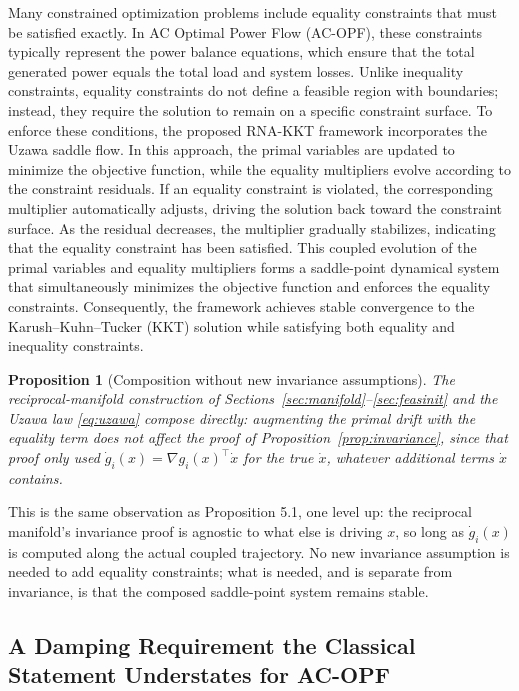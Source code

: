 \documentclass[11pt,onecolumn]{article}
\newtheorem{proposition}[theorem]{Proposition}
\theoremstyle{definition}
\theoremstyle{remark}
\begin{document}
Many constrained optimization problems include equality constraints that must be satisfied exactly. In AC Optimal Power Flow (AC-OPF), these constraints typically represent the power balance equations, which ensure that the total generated power equals the total load and system losses. Unlike inequality constraints, equality constraints do not define a feasible region with boundaries; instead, they require the solution to remain on a specific constraint surface. To enforce these conditions, the proposed RNA-KKT framework incorporates the Uzawa saddle flow. In this approach, the primal variables are updated to minimize the objective function, while the equality multipliers evolve according to the constraint residuals. If an equality constraint is violated, the corresponding multiplier automatically adjusts, driving the solution back toward the constraint surface. As the residual decreases, the multiplier gradually stabilizes, indicating that the equality constraint has been satisfied. This coupled evolution of the primal variables and equality multipliers forms a saddle-point dynamical system that simultaneously minimizes the objective function and enforces the equality constraints. Consequently, the framework achieves stable convergence to the Karush--Kuhn--Tucker (KKT) solution while satisfying both equality and inequality constraints.






\begin{proposition}[Composition without new invariance assumptions]
The reciprocal-manifold construction of Sections~\ref{sec:manifold}--\ref{sec:feasinit} and the
Uzawa law \eqref{eq:uzawa} compose directly: augmenting the primal drift with the equality term
does not affect the proof of Proposition~\ref{prop:invariance}, since that proof only used
$\dot g_i(x) = \nabla g_i(x)^\top \dot x$ for the true $\dot x$, whatever additional terms
$\dot x$ contains.
\end{proposition}

This is the same observation as Proposition 5.1, one level up: the reciprocal manifold's
invariance proof is agnostic to what else is driving $x$, so long as $\dot g_i(x)$ is computed
along the actual coupled trajectory. No new invariance assumption is needed to add equality
constraints; what is needed, and is separate from invariance, is that the composed saddle-point
system remains stable.

\subsection{A Damping Requirement the Classical Statement Understates for AC-OPF}
\end{document}
